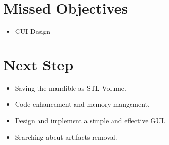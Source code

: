 \documentclass[11.5pt, b5paper]{article}
\begin{document}
\section{Missed Objectives}
\begin{itemize}
\item GUI Design
\end{itemize}

\section{Next Step}
\begin{itemize}
\item Saving the mandible as STL Volume.
\item Code enhancement and memory mangement.
\item Design and implement a simple and effective GUI.
\item Searching about artifacts removal.
\end{itemize}   
\end{document}

